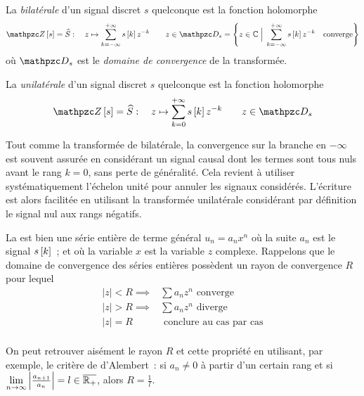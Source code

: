 \begin{definition} La \emph{\teZ{} bilatérale} d'un signal discret $s$
  quelconque est la fonction holomorphe
\begin{equation}
  \label{eq:transformee_en_z}
  \TZ\b{s} = \TZde{S} : \quad z\mapsto \sum_{k=-\infty}^{+\infty}s\b{k}z^{-k} \quad\quad z \in \domDe{s}= \left\lbrace z\in\mathbb{C} \; \Big| \; \sum_{k=-\infty}^{+\infty}s\b{k}z^{-k} \quad \mathrm{converge}\right\rbrace
\end{equation}
où $\domDe{s}$ est le \emph{domaine de convergence} de la transformée.


La \emph{\teZ{} unilatérale} d'un signal discret $s$
  quelconque est la fonction holomorphe
\begin{equation}
  \label{eq:transformee_en_z_unilaterale}
  \TZ\b{s} = \TZde{S} : \quad z\mapsto \sum_{k=0}^{+\infty}s\b{k}z^{-k} \quad\quad z \in \domDe{s}
\end{equation}
\end{definition}

Tout comme la transformée de \Laplace{} bilatérale, la convergence sur
la branche en $-\infty$ est souvent assurée en considérant un signal
causal dont les termes sont tous nuls avant le rang $k=0$, sans perte
de généralité. Cela revient à utiliser systématiquement l'échelon
unité pour annuler les signaux considérés. L'écriture est alors
facilitée en utilisant la transformée unilatérale considérant par
définition le signal nul aux rangs négatifs.

\begin{remarque}
  La \teZ{} est bien une série entière de terme général
  $ u_n= a_n x^n$ où la suite $a_n$ est le signal $s\b{k}$~; et où
  la variable $x$ est la variable $z$ complexe. Rappelons que le
  domaine de convergence des séries entières possèdent un rayon de
  convergence $R$ pour lequel
  $$
  \begin{array}{ll}
    |z|<R \implies  & \sum a_n z^n \text{ converge} \\
    |z|>R \implies  & \sum a_n z^n \text{ diverge} \\
    |z|=R  & \text{ conclure au cas par cas} \\

  \end{array}
  $$

  On peut retrouver aisément le rayon
  $R$ et cette propriété en utilisant, par exemple, le critère de
  d'Alembert~: si $a_n\neq0$ à partir d'un certain rang et si $
  \lim\limits_{n\to\infty} \left|\frac{a_{n+1}}{a_n}\right|=l \in
  \overline{\mathbb{R}_+}$, alors $R=\frac{1}{l}$.
\end{remarque}

